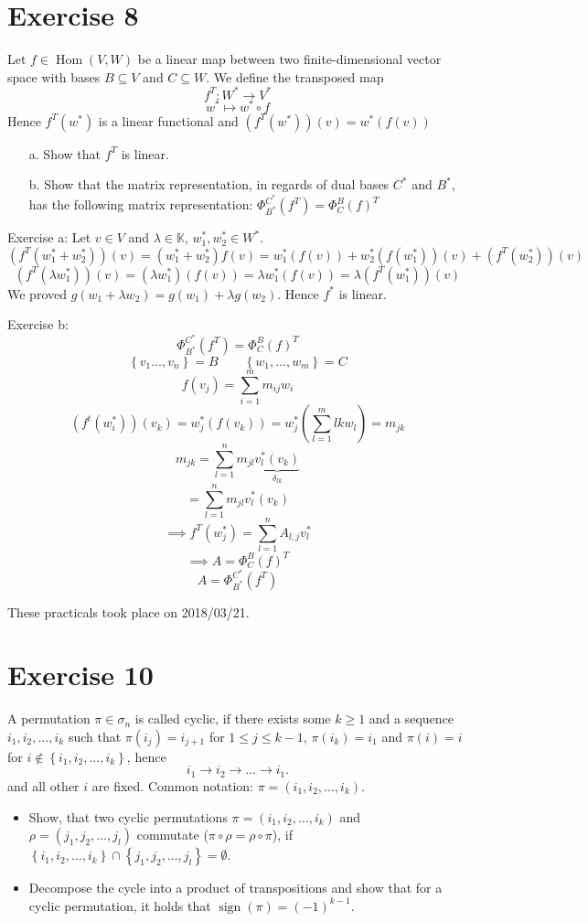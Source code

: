 \documentclass[a4paper]{article}
\theoremstyle{definition}
\DeclareMathOperator\sign{sign}
\newcommand\dateref[1]{These practicals took place on #1.\par}
\newcommand\set[1]{\left\{#1\right\}}
\begin{document}
\section{Exercise 8}
\begin{ex}
  Let $f \in \operatorname{Hom}(V, W)$ be a linear map between two finite-dimensional vector space with bases $B \subseteq V$ and $C \subseteq W$. We define the transposed map
  \[ f^T: W^* \to V^* \]
  \[ w^* \mapsto w^* \circ f \]
  Hence $f^T(w^*)$ is a linear functional and $(f^T(w^*))(v) = w^*(f(v))$
  \begin{enumerate}
    \item[a.]
      Show that $f^T$ is linear.
    \item[b.]
      Show that the matrix representation, in regards of dual bases $C^*$ and $B^*$, has the following matrix representation: $\Phi_{B^*}^{C^*}(f^T) = \Phi_C^B(f)^T$
  \end{enumerate}
\end{ex}

Exercise a:
Let $v \in V$ and $\lambda \in \mathbb K$, $w_1^*, w_2^* \in W^*$.
\[ (f^T(w_1^* + w_2^*))(v) = (w_1^* + w_2^*)f(v) = w_1^*(f(v)) + w_2^*(f(w_1^*))(v) + (f^T(w_2^*))(v) \]
\[ (f^T(\lambda w_1^*))(v) = (\lambda w_1^*)(f(v)) = \lambda w_1^*(f(v)) = \lambda (f^T(w_1^*))(v) \]
We proved $g(w_1 + \lambda w_2) = g(w_1) + \lambda g(w_2)$. Hence $f^*$ is linear.

Exercise b:
\[ \Phi_{B^*}^{C^*}(f^T) = \Phi_C^B(f)^T \]
\[ \set{v_1 \dots, v_n} = B \qquad \set{w_1, \dots, w_m} = C \]
\[ f(v_j) = \sum_{i=1}^m m_{ij} w_i \]
\[ (f^t(w_i^*))(v_k) = w_j^*(f(v_k)) = w_j^* \left(\sum_{l=1}^m {lk} w_l\right) = m_{jk} \]
\[ m_{jk} = \sum_{l=1}^n m_{jl} \underbrace{v_{l}^*(v_k)}_{\delta_{lk}} \]
\[ = \sum_{l=1}^n m_{jl} v_l^*(v_k) \]
\[ \implies f^T(w_j^*) = \sum_{l=1}^n A_{l,j} v_l^* \]
\[ \implies A = \Phi_C^B(f)^T \]
\[ A = \Phi_{B^*}^{C^*}(f^T) \]

\dateref{2018/03/21}

\section{Exercise 10}
\begin{ex}
  A permutation $\pi \in \sigma_n$ is called cyclic, if there exists some $k \geq 1$ and a sequence $i_1, i_2, \dots, i_k$ such that $\pi(i_j) = i_{j+1}$ for $1 \leq j \leq k-1$, $\pi(i_k) = i_1$ and $\pi(i) = i$ for $i \not\in \set{i_1, i_2, \dots, i_k}$, hence
  \[ i_1 \to i_2 \to \dots \to i_1. \]
  and all other $i$ are fixed. Common notation: $\pi = (i_1, i_2, \dots, i_k)$.
  \begin{itemize}
    \item Show, that two cyclic permutations $\pi = (i_1, i_2, \dots, i_k)$ and $\rho = (j_1, j_2, \dots, j_l)$ commutate ($\pi \circ \rho = \rho \circ \pi$), if $\set{i_1, i_2, \dots, i_k} \cap \set{j_1, j_2, \dots, j_l} = \emptyset$.
    \item Decompose the cycle into a product of transpositions and show that for a cyclic permutation, it holds that $\sign(\pi) = (-1)^{k-1}$.
  \end{itemize}
\end{ex}
\end{document}
